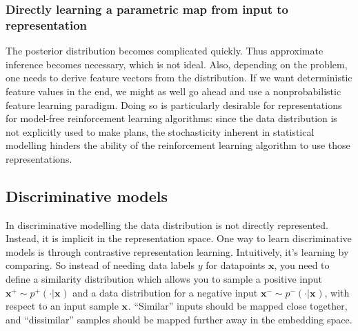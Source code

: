 \subsubsection{Directly learning a parametric map from input to representation}
The posterior distribution becomes complicated quickly.
Thus approximate inference becomes necessary, which is not ideal.
Also, depending on the problem, one needs to derive feature vectors
from the distribution.
If we want deterministic feature values in the end, we might as well
go ahead and use a nonprobabilistic feature learning paradigm.
Doing so is particularly desirable for representations for model-free 
reinforcement learning algorithms:
since the data distribution is not explicitly used to make plans,
the stochasticity inherent in statistical modelling hinders the ability
of the reinforcement learning algorithm to use those representations.


\subsection{Discriminative models}
In discriminative modelling the data distribution is not directly represented.
Instead, it is implicit in the representation space. 
One way to learn discriminative models is through contrastive representation learning.
Intuitively, it's learning by comparing.
So instead of needing data labels $ y  $ for datapoints $ \bm{x}$,
you need to define a similarity distribution which allows you to
sample a positive input $ \bm{x}_{}^{ + } \sim p^{ + } (\cdot | \bm{x}_{})  $
and a data distribution for a negative input $ \bm{x}_{}^{ - } \sim p^{ - } (\cdot | \bm{x}_{})  $,
with respect to an input sample $ \bm{x}_{}  $.
``Similar'' inputs should be mapped close together, and ``dissimilar'' samples
should be mapped further away in the embedding space.

